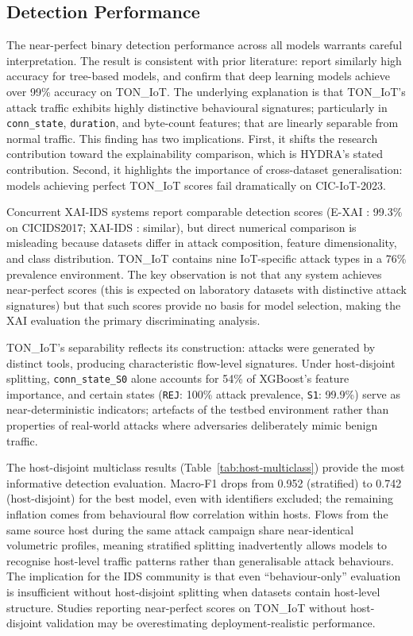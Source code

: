 \documentclass[12pt,a4paper]{report}
\begin{document}
\subsection{Detection Performance}
\label{sec:disc-detection}

The near-perfect binary detection performance across all models warrants careful interpretation. The result is consistent with prior literature: \cite{alsaedi2020} report similarly high accuracy for tree-based models, and \cite{tareq2022} confirm that deep learning models achieve over 99\% accuracy on TON\_IoT. The underlying explanation is that TON\_IoT's attack traffic exhibits highly distinctive behavioural signatures; particularly in \texttt{conn\_state}, \texttt{duration}, and byte-count features; that are linearly separable from normal traffic. This finding has two implications. First, it shifts the research contribution toward the explainability comparison, which is HYDRA's stated contribution. Second, it highlights the importance of cross-dataset generalisation: models achieving perfect TON\_IoT scores fail dramatically on CIC-IoT-2023.

Concurrent XAI-IDS systems report comparable detection scores (E-XAI \cite{arreche2024}: 99.3\% on CICIDS2017; XAI-IDS \cite{arreche2024b}: similar), but direct numerical comparison is misleading because datasets differ in attack composition, feature dimensionality, and class distribution. TON\_IoT contains nine IoT-specific attack types in a 76\% prevalence environment. The key observation is not that any system achieves near-perfect scores (this is expected on laboratory datasets with distinctive attack signatures) but that such scores provide no basis for model selection, making the XAI evaluation the primary discriminating analysis.

TON\_IoT's separability reflects its construction: attacks were generated by distinct tools, producing characteristic flow-level signatures. Under host-disjoint splitting, \texttt{conn\_state\_S0} alone accounts for 54\% of XGBoost's feature importance, and certain states (\texttt{REJ}: 100\% attack prevalence, \texttt{S1}: 99.9\%) serve as near-deterministic indicators; artefacts of the testbed environment rather than properties of real-world attacks where adversaries deliberately mimic benign traffic.

The host-disjoint multiclass results (Table~\ref{tab:host-multiclass}) provide the most informative detection evaluation. Macro-F1 drops from 0.952 (stratified) to 0.742 (host-disjoint) for the best model, even with identifiers excluded; the remaining inflation comes from behavioural flow correlation within hosts. Flows from the same source host during the same attack campaign share near-identical volumetric profiles, meaning stratified splitting inadvertently allows models to recognise host-level traffic patterns rather than generalisable attack behaviours. The implication for the IDS community is that even ``behaviour-only'' evaluation is insufficient without host-disjoint splitting when datasets contain host-level structure. Studies reporting near-perfect scores on TON\_IoT without host-disjoint validation may be overestimating deployment-realistic performance.
\end{document}
